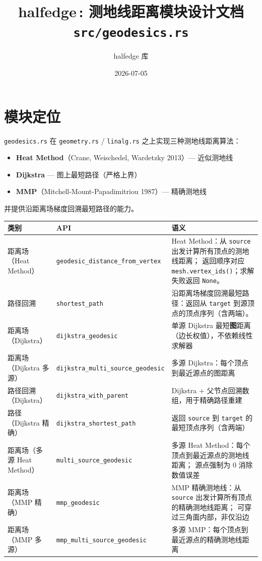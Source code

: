 \documentclass[11pt,a4paper]{article}
\title{\textbf{halfedge\,: 测地线距离模块设计文档} \\ \large \texttt{src/geodesics.rs}}
\author{halfedge 库}
\date{2026-07-05}
\begin{document}
\maketitle
\tableofcontents

\section{模块定位}

\texttt{geodesics.rs} 在 \texttt{geometry.rs} / \texttt{linalg.rs} 之上实现三种测地线距离算法：
\begin{itemize}
  \item \textbf{Heat Method}（Crane, Weischedel, Wardetzky 2013）— 近似测地线
  \item \textbf{Dijkstra} — 图上最短路径（严格上界）
  \item \textbf{MMP}（Mitchell-Mount-Papadimitriou 1987）— 精确测地线
\end{itemize}
并提供沿距离场梯度回溯最短路径的能力。

\begin{center}
\renewcommand{\arraystretch}{1.18}
\begin{tabular}{@{}llp{6.0cm}@{}}
  \toprule
  \textbf{类别} & \textbf{API} & \textbf{语义} \\
  \midrule
  距离场（Heat Method）
    & \texttt{geodesic\_distance\_from\_vertex}
    & Heat Method：从 \texttt{source} 出发计算所有顶点的测地线距离；
      返回顺序对应 \texttt{mesh.vertex\_ids()}；求解失败返回 \texttt{None}。 \\
  路径回溯
    & \texttt{shortest\_path}
    & 沿距离场梯度回溯最短路径：返回从 \texttt{target} 到源顶点的顶点序列（含两端）。 \\
  \midrule
  距离场（Dijkstra）
    & \texttt{dijkstra\_geodesic}
    & 单源 Dijkstra 最短\textbf{图}距离（边长权值），不依赖线性求解器 \\
  距离场（Dijkstra 多源）
    & \texttt{dijkstra\_multi\_source\_geodesic}
    & 多源 Dijkstra：每个顶点到最近源点的图距离 \\
  路径回溯（Dijkstra）
    & \texttt{dijkstra\_with\_parent}
    & Dijkstra + 父节点回溯数组，用于精确路径重建 \\
  路径（Dijkstra 精确）
    & \texttt{dijkstra\_shortest\_path}
    & 返回 \texttt{source} 到 \texttt{target} 的最短顶点序列（含两端） \\
  \midrule
  距离场（多源 Heat Method）
    & \texttt{multi\_source\_geodesic}
    & 多源 Heat Method：每个顶点到最近源点的测地线距离；
      源点强制为 $0$ 消除数值误差 \\
  \midrule
  距离场（MMP 精确）
    & \texttt{mmp\_geodesic}
    & MMP 精确测地线：从 \texttt{source} 出发计算所有顶点的精确测地线距离；
      可穿过三角面内部，非仅沿边 \\
  距离场（MMP 多源）
    & \texttt{mmp\_multi\_source\_geodesic}
    & 多源 MMP：每个顶点到最近源点的精确测地线距离 \\
  \bottomrule
\end{tabular}
\end{center}
\end{document}
